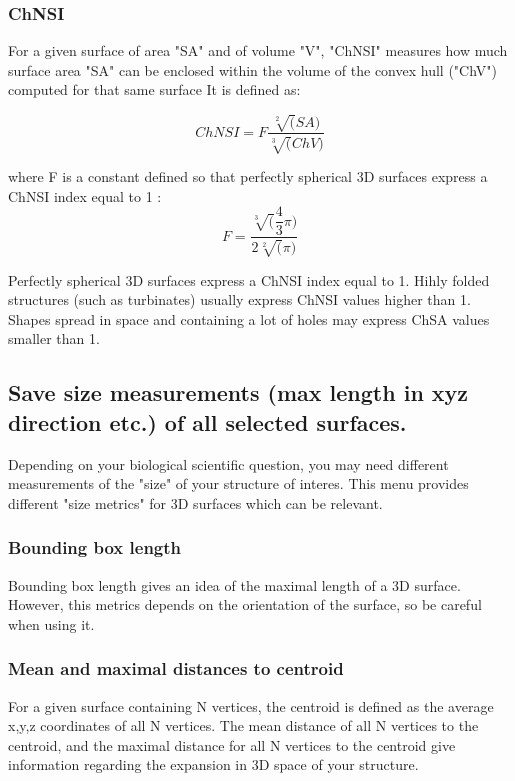 \subsubsection{ChNSI}
\noindent For a given surface of area "SA" and of volume "V", "ChNSI" measures how much surface area "SA" can be enclosed within the volume of the convex hull ("ChV") computed for that same surface It is defined as: 

\begin{equation}
ChNSI = F \dfrac{\sqrt[2](SA)}{\sqrt[3](ChV)}
\end{equation}

\noindent where F is a constant defined so that perfectly spherical 3D surfaces express a ChNSI index equal to 1 :
\begin{equation}
F = \dfrac{\sqrt[3](\dfrac{4}{3}\pi)}{2\sqrt[2](\pi)}
\end{equation}

\noindent Perfectly spherical 3D surfaces express a ChNSI index equal to 1. Hihly folded structures (such as turbinates) usually express ChNSI values higher than 1. Shapes spread in space and containing a lot of holes may express ChSA values smaller than 1.

\subsection{Save size measurements (max length in xyz direction etc.) of all selected surfaces.}
Depending on your biological scientific question, you may need different measurements of the "size" of your structure of interes. This menu provides different "size metrics" for 3D surfaces which can be relevant. \\
\subsubsection{Bounding box length}
Bounding box length gives an idea of the maximal length of a 3D surface. However, this metrics depends on the orientation of the surface, so be careful when using it.

\subsubsection{Mean and maximal distances to centroid}
For a given surface containing N vertices, the centroid is defined as the average x,y,z coordinates of all N vertices. The mean distance of all N vertices to the centroid, and the maximal distance for all N vertices to the centroid give information regarding the expansion in 3D space of your structure.
